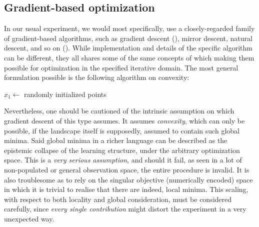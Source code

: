 \documentclass[10pt]{article} %
\begin{document}
\subsection{Gradient-based optimization}

In our usual experiment, we would most specifically, use a closely-regarded family of gradient-based algorithms, such as gradient descent (\cite{Cauchy:1847,Robbins:1951,Widrow:1960,Hestenes:1952,Fletcher:1964}), mirror descent, natural descent, and so on (\cite{nemirovski_yudin_1983,amari_1996_natural_riemannian_gradient,amari_1998_natural_gradient_works,yang_amari_1998_complexity_issues_natural_gradient,amari_rattray_saad_1998_natural_gradient_online,gunasekar_woodworth_srebro_2021_mirrorless_mirror_descent,luong_parpas_rueckert_rustem_2016_weighted_mirror_descent,xiao_zhang_2014_proximal_stochastic_gradient,sohl-dickstein_2012_natural_gradient_whitening,raskutti_mukherjee_2013_information_geometry_mirror_descent}). While implementation and details of the specific algorithm can be different, they all shares some of the same concepts of which making them possible for optimization in the specified iterative domain. The most general formulation possible is the following algorithm on convexity:

\begin{algorithm}[htb]
    \caption{Gradient descent on general convex function}
    \Begin
    {
    $x_{1}\gets$ randomly initialized points\;
    }
    \label{algo:algo_gd}
\end{algorithm}
Nevertheless, one should be cautioned of the intrinsic assumption on which gradient descent of this type assumes. It assumes \textit{convexity}, which can only be possible, if the landscape itself is supposedly, assumed to contain such global minima. Said global minima in a richer language can be described as the epistemic collapse of the learning structure, under the arbitrary optimization space. This is a \textit{very serious assumption}, and should it fail, as seen in a lot of non-populated or general observation space, the entire procedure is invalid. It is also troublesome as to rely on the singular objective (numerically encoded) space in which it is trivial to realise that there are indeed, local minima. This scaling, with respect to both locality and global consideration, must be considered carefully, since \textit{every single contribution} might distort the experiment in a very unexpected way. 
\end{document}
